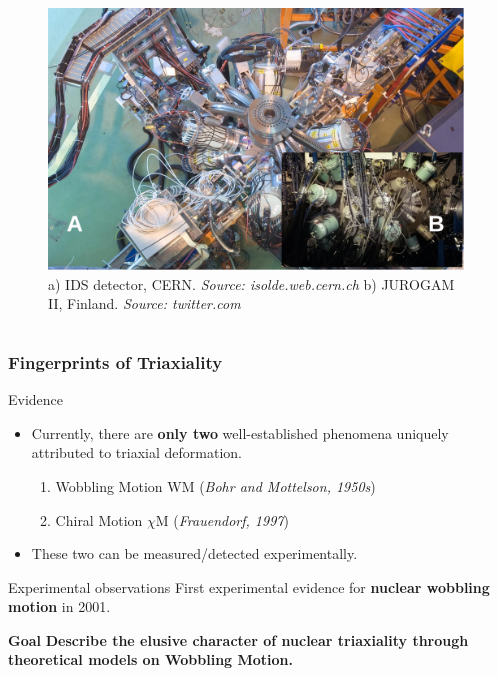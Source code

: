 \documentclass[
	11pt, %
]{beamer}
\begin{document}
\begin{frame}
\begin{columns}
	\begin{figure}
		\centering
		\includegraphics[width=0.98\textwidth]{figures/isolde_cern_2.png}
		\caption{a) IDS detector, CERN. \textit{Source: isolde.web.cern.ch} b) JUROGAM II, Finland. \textit{Source: twitter.com}}
		\end{figure}
	\end{columns}
\end{frame}

\begin{frame}
	\frametitle{Fingerprints of Triaxiality}
	\begin{block}{Evidence \faSearch}
		\begin{itemize}
			\item Currently, there are \textbf{only two} well-established phenomena uniquely attributed to triaxial deformation.
			\begin{enumerate}
				\item Wobbling Motion WM (\emph{Bohr and Mottelson, 1950s})
				\item Chiral Motion $\chi$M (\emph{Frauendorf, 1997})
			\end{enumerate}
			\item These two can be measured/detected experimentally.
		\end{itemize}
	\end{block}
	\begin{alertblock}{Experimental observations \faSearch}
		First experimental evidence for \textbf{nuclear wobbling motion} in 2001.
	\end{alertblock}
	\begin{exampleblock}{\textbf{Goal} \faClipboard}
		\textbf{Describe the elusive character of nuclear triaxiality through theoretical models on Wobbling Motion.}
	\end{exampleblock}
\end{frame}
\end{document}
